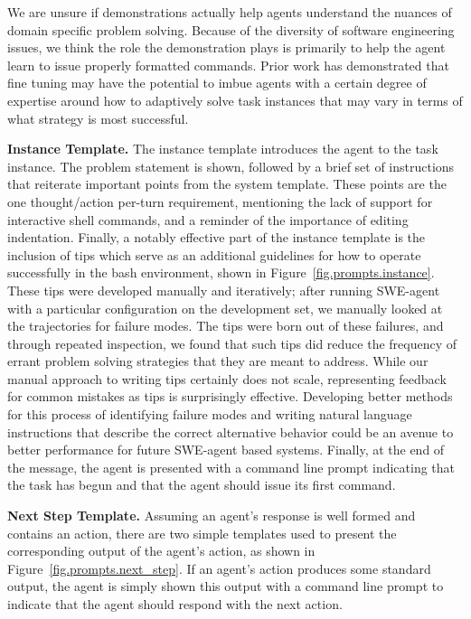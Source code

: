 

We are unsure if demonstrations actually help agents understand the nuances of domain specific problem solving.
Because of the diversity of software engineering issues, we think the role the demonstration plays is primarily to help the agent learn to issue properly formatted commands.
Prior work has demonstrated that fine tuning may have the potential to imbue agents with a certain degree of expertise around how to adaptively solve task instances that may vary in terms of what strategy is most successful.

\textbf{Instance Template.}
The instance template introduces the agent to the task instance.
The problem statement is shown, followed by a brief set of instructions that reiterate important points from the system template.
These points are the one thought/action per-turn requirement, mentioning the lack of support for interactive shell commands, and a reminder of the importance of editing indentation.
Finally, a notably effective part of the instance template is the inclusion of tips which serve as an additional guidelines for how to operate successfully in the bash environment, shown in Figure~\ref{fig.prompts.instance}.
These tips were developed manually and iteratively; after running SWE-agent with a particular configuration on the development set, we manually looked at the trajectories for failure modes.
The tips were born out of these failures, and through repeated inspection, we found that such tips did reduce the frequency of errant problem solving strategies that they are meant to address.
While our manual approach to writing tips certainly does not scale, representing feedback for common mistakes as tips is surprisingly effective.
Developing better methods for this process of identifying failure modes and writing natural language instructions that describe the correct alternative behavior could be an avenue to better performance for future SWE-agent based systems.
Finally, at the end of the message, the agent is presented with a command line prompt indicating that the task has begun and that the agent should issue its first command.



\textbf{Next Step Template.}
Assuming an agent’s response is well formed and contains an action, there are two simple templates used to present the corresponding output of the agent’s action, as shown in Figure~\ref{fig.prompts.next_step}.
If an agent’s action produces some standard output, the agent is simply shown this output with a command line prompt to indicate that the agent should respond with the next action.

